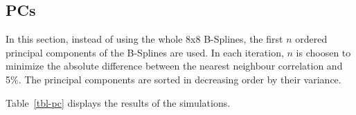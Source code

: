 \documentclass[
]{article}
\begin{document}
\begin{table}

\caption{\label{tbl-HAC-8x8-u-ci-unif-bs-morgan}Confidence Interval
length of different HAC variance estimators of the standard error with
an 8x8 \textbf{triangular} B-splines. 1000 simulations. \textbf{500}
points. Column \emph{Corr} shows the theoretical correlation at distance
\(h=0.1\), \(corr=\rho*\exp(-\frac{1}{\sqrt{2}})\).}


\end{table}%

\subsection{PCs}\label{pcs}

In this section, instead of using the whole 8x8 B-Splines, the first
\(n\) ordered principal components of the B-Splines are used. In each
iteration, \(n\) is choosen to minimize the absolute difference between
the nearest neighbour correlation and 5\%. The principal components are
sorted in decreasing order by their variance.

Table~\ref{tbl-pc} displays the results of the simulations.
\end{document}
